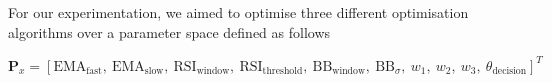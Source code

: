 For our experimentation, we aimed to optimise three different optimisation algorithms over a parameter space defined as follows

\[
\mathbf{P}_x = 
\left[
    \text{EMA}_{\text{fast}},\ 
    \text{EMA}_{\text{slow}},\ 
    \text{RSI}_{\text{window}},\ 
    \text{RSI}_{\text{threshold}},\ 
    \text{BB}_{\text{window}},\ 
    \text{BB}_{\sigma},\ 
    w_1,\ 
    w_2,\ 
    w_3,\ 
    \theta_{\text{decision}}
\right]^T
\]